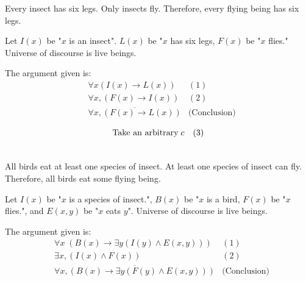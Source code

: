 \documentclass[]{article}
\begin{document}
\begin{question}{1.3}
Every insect has six legs. Only insects fly. Therefore, every flying being has six legs.

Let $I(x)$ be "$x$ is an insect". $L(x)$ be "$x$ has six legs, $F(x)$ be "$x$ flies." Universe of discourse is live beings.
\end{question}

The argument given is:
\begin{align*}
    & \forall x(I(x) \rightarrow L(x)) & (1)\\
    & \forall x, (F(x) \rightarrow I(x)) & (2)\\
    & \overline{\forall x, (F(x) \rightarrow L(x))} & \text{(Conclusion)}
\end{align*}

\begin{align*}
    &\text{Take an arbitrary}\; c &  \hfill & (3) \\
    &\quad 
\end{align*} 

\begin{question}{1.4}
All birds eat at least one species of insect. At least one species of insect can fly. Therefore, all birds
eat some flying being.

Let $I(x)$ be "$x$ is a species of insect.", $B(x)$ be "$x$ is a bird, $F(x)$ be "$x$ flies.", and $E(x,y)$ be "$x$ eats $y$". Universe of discourse is live beings.
\end{question}

The argument given is:
\begin{align*}
    & \forall x\;(B(x) \rightarrow \exists y(I(y) \land E(x, y))) & (1)\\
    & \exists x, (I(x) \land F(x)) & (2)\\
    & \overline{\forall x, (B(x) \rightarrow \exists y(F(y) \land E(x, y)))} & \text{(Conclusion)}
\end{align*}
\end{document}
